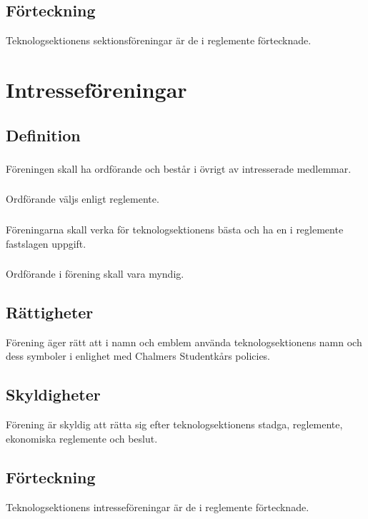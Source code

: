 \documentclass[a4paper, 10pt]{article}
\begin{document}
\subsection{Förteckning}
Teknologsektionens sektionsföreningar är de i reglemente förtecknade.
\newpage

\section{Intresseföreningar}
\subsection{Definition}
\subsubsection{}
Föreningen skall ha ordförande och består i övrigt av intresserade medlemmar.
\subsubsection{}
Ordförande väljs enligt reglemente.
\subsubsection{}
Föreningarna skall verka för teknologsektionens bästa och ha en i reglemente fastslagen uppgift.
\subsubsection{}
Ordförande i förening skall vara myndig.
\subsection{Rättigheter}
Förening äger rätt att i namn och emblem använda teknologsektionens namn och dess symboler i enlighet med Chalmers Studentkårs policies.
\subsection{Skyldigheter}
Förening är skyldig att rätta sig efter teknologsektionens stadga, reglemente, ekonomiska reglemente och beslut.
\subsection{Förteckning}
Teknologsektionens intresseföreningar är de i reglemente förtecknade.
\newpage
\end{document}
